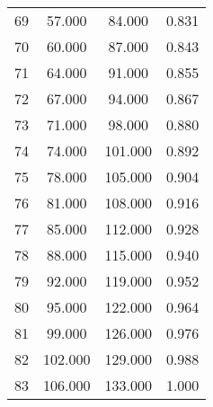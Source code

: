 \begin{tabular}{cccc}
  69 & 57.000 & 84.000 & 0.831 \\ 
  70 & 60.000 & 87.000 & 0.843 \\ 
  71 & 64.000 & 91.000 & 0.855 \\ 
  72 & 67.000 & 94.000 & 0.867 \\ 
  73 & 71.000 & 98.000 & 0.880 \\ 
  74 & 74.000 & 101.000 & 0.892 \\ 
  75 & 78.000 & 105.000 & 0.904 \\ 
  76 & 81.000 & 108.000 & 0.916 \\ 
  77 & 85.000 & 112.000 & 0.928 \\ 
  78 & 88.000 & 115.000 & 0.940 \\ 
  79 & 92.000 & 119.000 & 0.952 \\ 
  80 & 95.000 & 122.000 & 0.964 \\ 
  81 & 99.000 & 126.000 & 0.976 \\ 
  82 & 102.000 & 129.000 & 0.988 \\ 
  83 & 106.000 & 133.000 & 1.000 \\ 
   \hline
\end{tabular}
